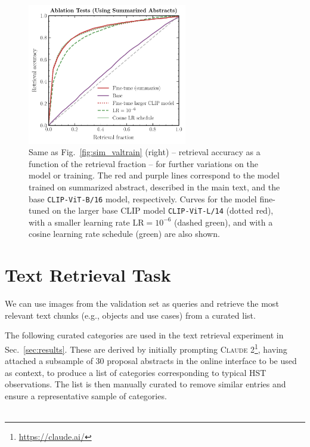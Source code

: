 \documentclass{article} %
\begin{document}
\begin{figure}[!h]
  \centering
  \includegraphics[width=0.62\textwidth]{plots/retrieval_app.pdf}
  \caption{Same as Fig.~\ref{fig:sim_valtrain} (right) -- retrieval accuracy as a function of the retrieval fraction -- for further variations on the model or training. The red and purple lines correspond to the model trained on summarized abstract, described in the main text, and the base \texttt{CLIP-ViT-B/16} model, respectively. Curves for the model fine-tuned on the larger base CLIP model \texttt{CLIP-ViT-L/14} (dotted red), with a smaller learning rate $\mathrm{LR}=10^{-6}$ (dashed green), and with a cosine learning rate schedule (green) are also shown.}
  \label{fig:sim_app}
  \end{figure}

  \section{Text Retrieval Task}
  \label{app:text_retrieval}
   
  We can use images from the validation set as queries and retrieve the most relevant text chunks (e.g., objects and use cases) from a curated list.

  The following curated categories are used in the text retrieval experiment in Sec.~\ref{sec:results}.
%
These are derived by initially prompting \textsc{Claude 2}\footnote{\url{https://claude.ai/}}, having attached a subsample of 30 proposal abstracts in the online interface to be used as context, to produce a list of categories corresponding to typical HST observations. The list is then manually curated to remove similar entries and ensure a representative sample of categories. \\ \\ 
\end{document}
